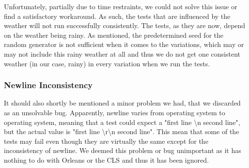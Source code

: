 Unfortunately, partially due to time restraints, we could not solve this issue or find a satisfactory workaround. As such, the tests that are influenced by the weather will not run successfully consistently. The tests, as they are now, depend on the weather being rainy. As mentioned, the predetermined seed for the random generator is not sufficient when it comes to the variations, which may or may not include this rainy weather at all and thus we do not get one consistent weather (in our case, rainy) in every variation when we run the tests.
\subsubsection{Newline Inconsistency}
It should also shortly be mentioned a minor problem we had, that we discarded as an unsolvable bug. Apparently, newline varies from operating system to operating system, meaning that a test could expect a "first line \textbackslash n second line", but the actual value is "first line \textbackslash r\textbackslash n second line". This mean that some of the tests may fail even though they are virtually the same except for the inconsistency of newline. We deemed this problem or bug unimportant as it has nothing to do with Orleans or the CLS and thus it has been ignored.

